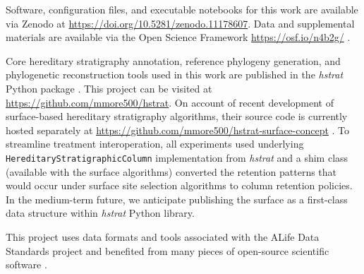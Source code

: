 Software, configuration files, and executable notebooks for this work are available via Zenodo at \url{https://doi.org/10.5281/zenodo.11178607}.
Data and supplemental materials are available via the Open Science Framework \url{https://osf.io/n4b2g/} \citep{foster2017open}.

Core hereditary stratigraphy annotation, reference phylogeny generation, and phylogenetic reconstruction tools used in this work are published in the \textit{hstrat} Python package \citep{moreno2022hstrat}.
This project can be visited at \url{https://github.com/mmore500/hstrat}.
On account of recent development of surface-based hereditary stratigraphy algorithms, their source code is currently hosted separately at \url{https://github.com/mmore500/hstrat-surface-concept} \citep{moreno2024hsurf}.
To streamline treatment interoperation, all experiments used underlying \texttt{HereditaryStratigraphicColumn} implementation from \textit{hstrat} and a shim class (available with the surface algorithms) converted the retention patterns that would occur under surface site selection algorithms to column retention policies.
In the medium-term future, we anticipate publishing the surface as a first-class data structure within \textit{hstrat} Python library.

This project uses data formats and tools associated with the ALife Data Standards project \citep{lalejini2019data} and benefited from many pieces of open-source scientific software \citep{sand2014tqdist,2020SciPy-NMeth,harris2020array,reback2020pandas,mckinney-proc-scipy-2010,sukumaran2010dendropy,cock2009biopython,torchiano2016effsize,waskom2021seaborn,hunter2007matplotlib,moreno2024apc,moreno2024qspool,moreno2023teeplot,hagen2021gen3sis,torchiano2016effsize}.
